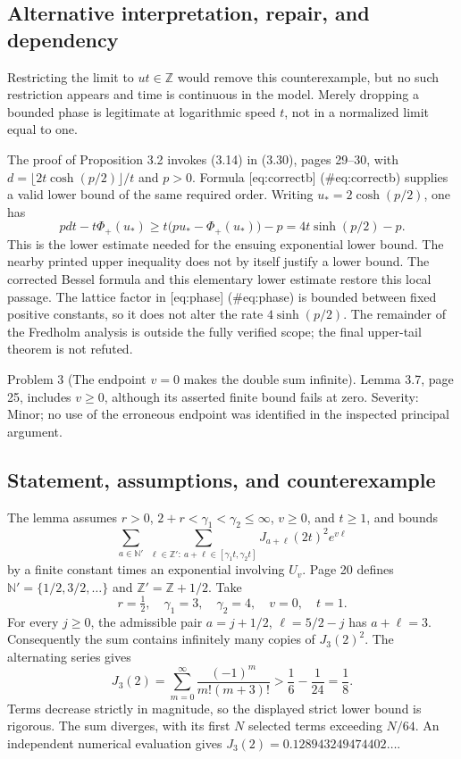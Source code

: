 \documentclass[10pt]{article}
\begin{document}
\subsection*{Alternative interpretation, repair, and dependency}
Restricting the limit to \(ut\in\mathbb Z\) would remove this counterexample, but no such restriction appears and time is continuous in the model. Merely dropping a bounded phase is legitimate at logarithmic speed \(t\), not in a normalized limit equal to one.\par
The proof of Proposition 3.2 invokes (3.14) in (3.30), pages 29–30, with \(d=\lfloor2t\cosh(p/2)\rfloor/t\) and \(p>0\). Formula [eq:correctb] (\#eq:correctb) supplies a valid lower bound of the same required order. Writing \(u_*=2\cosh(p/2)\), one has \[pdt-t\Phi_+(u_*)\ge t\big(pu_*-\Phi_+(u_*)\big)-p
 =4t\sinh(p/2)-p.\] This is the lower estimate needed for the ensuing exponential lower bound. The nearby printed upper inequality does not by itself justify a lower bound. The corrected Bessel formula and this elementary lower estimate restore this local passage. The lattice factor in [eq:phase] (\#eq:phase) is bounded between fixed positive constants, so it does not alter the rate \(4\sinh(p/2)\). The remainder of the Fredholm analysis is outside the fully verified scope; the final upper-tail theorem is not refuted.\par
Problem 3 (The endpoint \(v=0\) makes the double sum infinite).  Lemma 3.7, page 25, includes \(v\ge0\), although its asserted finite bound fails at zero. Severity: Minor; no use of the erroneous endpoint was identified in the inspected principal argument.\par
\subsection*{Statement, assumptions, and counterexample}
The lemma assumes \(r>0\), \(2+r<\gamma_1<\gamma_2\le\infty\), \(v\ge0\), and \(t\ge1\), and bounds \[\sum_{a\in\mathbb N'}\ 
 \sum_{\ell\in\mathbb Z':\ a+\ell\in[\gamma_1t,\gamma_2t]}
 J_{a+\ell}(2t)^2 e^{v\ell}\] by a finite constant times an exponential involving \(U_v\). Page 20 defines \(\mathbb N'=\{1/2,3/2,\ldots\}\) and \(\mathbb Z'=\mathbb Z+1/2\). Take \[r=\tfrac12,\quad \gamma_1=3,\quad\gamma_2=4,\quad v=0,\quad t=1.\] For every \(j\ge0\), the admissible pair \(a=j+1/2\), \(\ell=5/2-j\) has \(a+\ell=3\). Consequently the sum contains infinitely many copies of \(J_3(2)^2\). The alternating series gives \[J_3(2)=\sum_{m=0}^{\infty}\frac{(-1)^m}{m!(m+3)!}
 >\frac16-\frac1{24}=\frac18.\] Terms decrease strictly in magnitude, so the displayed strict lower bound is rigorous. The sum diverges, with its first \(N\) selected terms exceeding \(N/64\). An independent numerical evaluation gives \(J_3(2)=0.128943249474402\ldots\).\par
\end{document}
